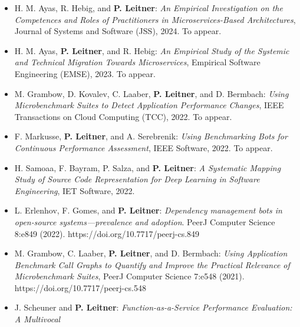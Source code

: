 \documentclass[paper=letter,fontsize=11pt]{scrartcl} %
\begin{document}
\begin{itemize}
  \item H. M. Ayas, R. Hebig, and \textbf{P. Leitner}: \emph{An Empirical Investigation on the Competences and Roles of Practitioners in Microservices-Based Architectures}, Journal of Systems and Software (JSS), 2024. To appear.  
  \item H. M. Ayas, \textbf{P. Leitner}, and R. Hebig: \emph{An Empirical Study of the Systemic and Technical Migration Towards Microservices}, Empirical Software Engineering (EMSE), 2023. To appear.  
  \item M. Grambow, D. Kovalev, C. Laaber, \textbf{P. Leitner}, and D. Bermbach: \emph{Using Microbenchmark Suites to Detect Application Performance Changes}, IEEE Transactions on Cloud Computing (TCC), 2022. To appear.  
  \item F. Markusse, \textbf{P. Leitner}, and A. Serebrenik: \emph{Using Benchmarking Bots for Continuous Performance Assessment}, IEEE Software, 2022. To appear.  
  \item H. Samoaa, F. Bayram, P. Salza, and \textbf{P. Leitner}: \emph{A Systematic Mapping Study of Source Code Representation for Deep Learning in Software Engineering}, IET Software, 2022.
  \item L. Erlenhov,  F. Gomes, and \textbf{P. Leitner}: \emph{Dependency management bots in open-source systems—prevalence and adoption}. PeerJ Computer Science 8:e849 (2022). https://doi.org/10.7717/peerj-cs.849
  \item M. Grambow, C. Laaber, \textbf{P. Leitner}, and D. Bermbach: \emph{Using Application Benchmark Call Graphs
  to Quantify and Improve the Practical
  Relevance of Microbenchmark Suites}, PeerJ Computer Science 7:e548 (2021). https://doi.org/10.7717/peerj-cs.548
	\item  J. Scheuner and \textbf{P. Leitner}: \emph{Function-as-a-Service Performance Evaluation: A Multivocal
}
\end{itemize}
\end{document}
